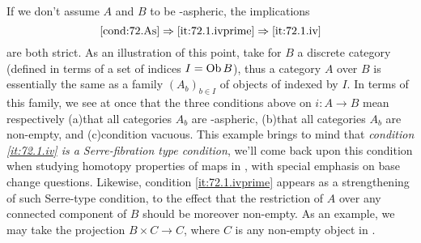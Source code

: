\begin{remarknum}
  If we don't assume $A$ and $B$ to be \scrW-aspheric, the
  implications
  \[ \text{\ref{cond:72.As}} \Rightarrow \text{\ref{it:72.1.ivprime}}
    \Rightarrow \text{\ref{it:72.1.iv}}\]
  are both strict. As an illustration of this point, take for $B$ a
  discrete category (defined in terms of a set of indices $I=\operatorname{Ob} B$),
  thus a category $A$ over $B$ is essentially the same as a family
  $(A_b)_{b\in I}$ of objects of \Cat{} indexed by $I$. In terms of
  this family, we see at once that the three conditions above on
  $i:A\to B$ mean respectively (a)\enspace that all categories $A_b$
  are \scrW-aspheric, (b)\enspace that all categories $A_b$ are
  non-empty, and (c)\enspace condition vacuous. This example brings to
  mind that \emph{condition \textup{\ref{it:72.1.iv}} is a
    Serre-fibration type condition}, we'll come back upon this
  condition when studying homotopy properties of maps in \Cat, with
  special emphasis on base change questions. Likewise, condition
  \ref{it:72.1.ivprime} appears as a strengthening of such Serre-type
  condition, to the effect that the restriction of $A$ over any
  connected component of $B$ should be moreover non-empty. As an
  example, we may take the projection $B\times C\to C$, where $C$ is
  any non-empty object in \Cat.
\end{remarknum}

